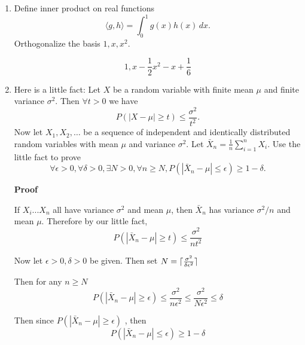 \documentclass{article}
\DeclarePairedDelimiter{\ceil}{\lceil}{\rceil}
\begin{document}
\begin{enumerate}

\item Define inner product on real functions
$$\langle g, h \rangle = \int_0^1 g(x)h(x)\,dx.$$
Orthogonalize the basis $1, x, x^2$.

\[
1, x-\frac{1}{2} x^2 - x + \frac{1}{6}
\]

\item Here is a little fact: Let $X$ be a random variable with finite mean $\mu$ and finite variance $\sigma^2$.  Then $\forall t>0$ we have
$$P(|X-\mu| \ge t) \le \frac{\sigma^2}{t^2}.$$
Now let $X_1, X_2, \ldots$ be a sequence of independent and identically distributed random variables with mean $\mu$ and variance $\sigma^2$.
Let $\bar{X}_n = \frac{1}{n}\sum_{i=1}^n X_i$.
Use the little fact to prove 
$$\forall \epsilon>0, \forall \delta>0, \exists N>0, \forall n\ge N, P(|\bar{X}_n - \mu|\le \epsilon)\ge 1-\delta.$$

\textbf{Proof}

If $X_i ... X_n$ all have variance $\sigma^2$ and mean $\mu$, then $\bar{X}_n$ has variance $\sigma^2/n$ and mean $\mu$. Therefore by our little fact,
\[
P(|\bar{X}_n - \mu| \geq t) \leq \frac{\sigma^2}{nt^2}
\]

Now let $\epsilon > 0, \delta > 0$ be given. 
Then set $N = \ceil{\frac{\sigma^2}{\delta\epsilon^2}}$

Then for any $n \geq N$
\[
P(|\bar{X}_n - \mu| \geq \epsilon) \leq \frac{\sigma^2}{n\epsilon^2} \leq \frac{\sigma^2}{N\epsilon^2} \leq \delta
\]

Then since $P(|\bar{X}_n - \mu| \geq \epsilon)$ , then
\[
P(|\bar{X}_n - \mu| \leq \epsilon) \geq 1 - \delta
\]

\end{enumerate}
\end{document}
